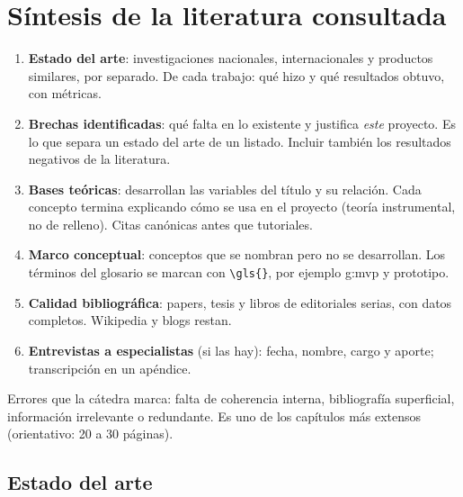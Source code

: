 
\chapter{Síntesis de la literatura consultada}\label{cap:marco-teorico}

\begin{guia}
\begin{enumerate}
    \item \textbf{Estado del arte}: investigaciones nacionales,
          internacionales y productos similares, por separado. De cada
          trabajo: qué hizo y qué resultados obtuvo, con métricas.
    \item \textbf{Brechas identificadas}: qué falta en lo existente y
          justifica \emph{este} proyecto. Es lo que separa un estado del
          arte de un listado. Incluir también los resultados negativos de
          la literatura.
    \item \textbf{Bases teóricas}: desarrollan las variables del título y su
          relación. Cada concepto termina explicando cómo se usa en el
          proyecto (teoría instrumental, no de relleno). Citas canónicas
          antes que tutoriales.
    \item \textbf{Marco conceptual}: conceptos que se nombran pero no se
          desarrollan. Los términos del glosario se marcan con
          \verb|\gls{}|, por ejemplo \gls{g:mvp} y \gls{prototipo}.
    \item \textbf{Calidad bibliográfica}: papers, tesis y libros de
          editoriales serias, con datos completos. Wikipedia y blogs restan.
    \item \textbf{Entrevistas a especialistas} (si las hay): fecha, nombre,
          cargo y aporte; transcripción en un apéndice.
\end{enumerate}
Errores que la cátedra marca: falta de coherencia interna, bibliografía
superficial, información irrelevante o redundante. Es uno de los
capítulos más extensos (orientativo: 20 a 30 páginas).
\end{guia}

\section{Estado del arte}\label{sec:n3.1}

